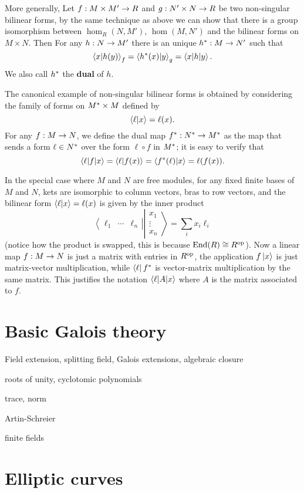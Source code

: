 More generally, Let $f:M\times M'\rightarrow R$ and $g:N'\times N\rightarrow R$ be two
non-singular bilinear forms, by the same technique as above we can
show that there is a group isomorphism between $\hom_R(N,M')$,
$\hom(M,N')$ and the bilinear forms on $M\times N$. Then For any
$h:N\rightarrow M'$ there is an unique $h^\ast:M\rightarrow N'$ such that
\[\left\langle x \middle| h(y) \right\rangle_f = \left\langle h^\ast(x) \middle| y \right\rangle_g =
\left\langle x \middle| h \middle| y \right\rangle\text{.}\]
We also call $h^\ast$ the \textbf{dual} of $h$.

The canonical example of non-singular bilinear forms is obtained by
considering the family of forms on $M^\ast\times M$ defined by
\[\left\langle \ell \middle| x \right\rangle = \ell(x) \text{.}\]
For any $f:M\rightarrow N$, we define the dual map
$f^\ast:N^\ast\rightarrow M^\ast$ as the map that sends a form
$\ell\in N^\ast$ over the form $\ell\circ f$ in $M^\ast$; it is
easy to verify that
\[\left\langle \ell \middle| f \middle| x \right\rangle =  \left\langle \ell \middle| f(x) \right\rangle = \left\langle f^\ast(\ell) \middle| x \right\rangle
= \ell(f(x))\text{.}\]

In the special case where $M$ and $N$ are free modules, for any fixed
finite bases of $M$ and $N$, kets are isomorphic to column vectors,
bras to row vectors, and the bilinear form $\left\langle \ell \middle| x \right\rangle=\ell(x)$
is given by the inner product
\begin{equation*}
  \left\langle\begin{matrix}
      \ell_1 &\cdots & \ell_n
    \end{matrix}\right\rvert
  \left\lvert\begin{matrix}
    x_1\\
    \vdots\\
    x_n
  \end{matrix}\right\rangle
  =
  \sum_i x_i\ell_i
\end{equation*}
(notice how the product is swapped, this is because $\operatorname{End}(R)\cong
R^{\mathrm{op}}$).  Now a linear map $f:M\rightarrow N$ is just a matrix with entries in
$R^{\mathrm{op}}$, the application $f\left\lvert x \right\rangle$ is just matrix-vector
multiplication, while $\left\langle \ell \right\rvert f^\ast$ is vector-matrix
multiplication by the same matrix. This justifies the notation
$\left\langle \ell \middle| A \middle| x \right\rangle$ where $A$ is the matrix associated to $f$.


\section{Basic Galois theory}
\label{sec:basic-galois-theory}
Field extension, splitting field, Galois extensions, algebraic closure

roots of unity, cyclotomic polynomials

trace, norm

Artin-Schreier

finite fields


\section{Elliptic curves}
\label{sec:elliptic-curves}






